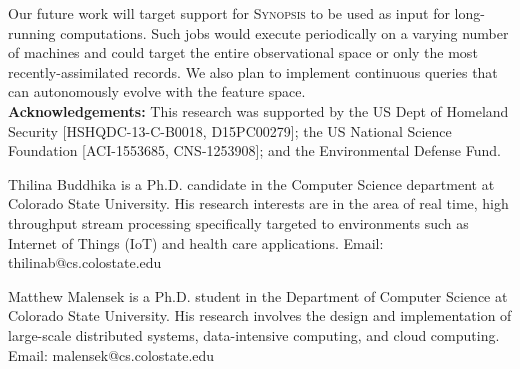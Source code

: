 \documentclass[9pt,journal,compsoc]{IEEEtran}
\begin{document}
Our future work will target support for \textsc{Synopsis} to be used as input for long-running computations. Such jobs would execute periodically on a varying number of machines and could target the entire observational space or only the most recently-assimilated records. We also plan to implement continuous queries that can autonomously evolve with the feature space.
\vspace{1em}\\
%
%
\textbf{Acknowledgements:}
This research was supported by the US Dept of Homeland Security [HSHQDC-13-C-B0018, D15PC00279]; the US National Science Foundation [ACI-1553685, CNS-1253908]; and the Environmental Defense Fund.



\vspace*{-3.7\baselineskip}
\begin{IEEEbiography}{Thilina Buddhika} is a Ph.D. candidate in the Computer Science department at Colorado State University.  His research interests are in the area of real time, high throughput stream processing specifically targeted to environments such as Internet of Things (IoT) and health care applications. Email: thilinab@cs.colostate.edu
\end{IEEEbiography}
\vspace{-1.60cm}
\begin{IEEEbiography}{Matthew Malensek} is a Ph.D. student in the Department of Computer Science at Colorado State University. His research involves the design and implementation of large-scale distributed systems, data-intensive computing, and cloud computing. Email: malensek@cs.colostate.edu
\end{IEEEbiography}
\end{document}
